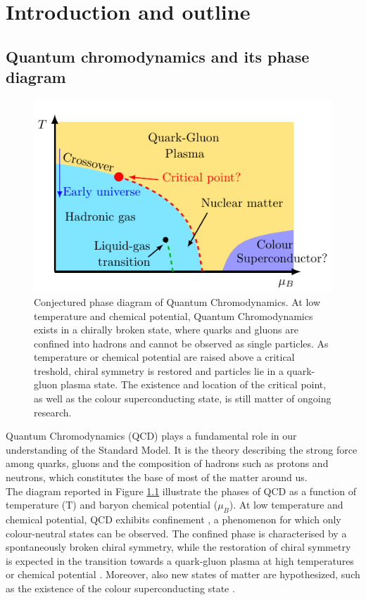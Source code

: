 \chapter{Introduction and outline}
\label{chap:introduction}
\section{Quantum chromodynamics and its phase diagram}
\begin{figure}[h]
    \centering 
    \includegraphics[scale=1.3]{figures/phase_diagram.pdf}
    \caption[The phase diagram of QCD]{Conjectured phase diagram of Quantum Chromodynamics. At low temperature and chemical potential, Quantum Chromodynamics exists in a chirally broken state, where quarks and gluons are confined into hadrons and cannot be observed as single particles. As temperature or chemical potential are raised above a critical treshold, chiral symmetry is restored and particles lie in a quark-gluon plasma state. The existence and location of the critical point, as well as the colour superconducting state, is still matter of ongoing research.}
    \label{fig:QCD_phase_diagram}
\end{figure}
Quantum Chromodynamics (QCD) plays a fundamental role in our understanding of the Standard Model. It is the theory describing the strong force among quarks, gluons and the composition of hadrons such as protons and neutrons, which constitutes the base of most of the matter around us. \\
The diagram reported in Figure \ref{fig:QCD_phase_diagram} illustrate the phases of QCD as a function of temperature (T) and baryon chemical potential ($\mu_B$).
At low temperature and chemical potential, QCD exhibits confinement \cite{confinement_wilson,confin}, a phenomenon for which only colour-neutral states can be observed. The confined phase is characterised by a spontaneously broken chiral symmetry, while the restoration of chiral symmetry is expected in the transition towards a quark-gluon plasma at high temperatures or chemical potential \cite{Masayuki1989,Stephanov_1998,Berges_1999,doi:10.1142/S0217751X92001757}. Moreover, also new states of matter are hypothesized, such as the existence of the colour superconducting state \cite{colorsuper1,colorsuper2,colorsuper3}. \\
